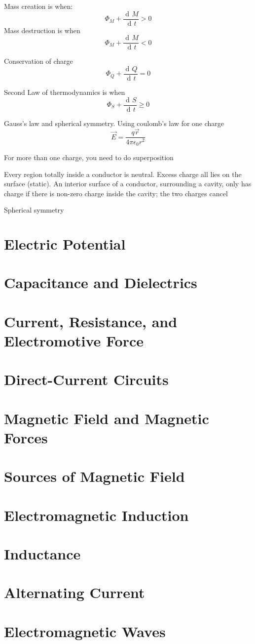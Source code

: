 \documentclass[11pt, letterpaper, titlepage]{report}
\DeclareMathOperator{\di}{d\!} %
\begin{document}
Mass creation is when:
\begin{equation}
\Phi_M + \frac{\di M}{\di t} > 0
\end{equation}
Mass destruction is when
\begin{equation}
\Phi_M + \frac{\di M}{\di t} < 0
\end{equation}

Conservation of charge
\begin{equation}
\Phi_Q + \frac{\di Q}{\di t} = 0
\end{equation}

Second Law of thermodynamics is when
\begin{equation}
\Phi_S + \frac{\di S}{\di t} \geq 0
\end{equation}

Gauss's law and spherical symmetry. Using coulomb's law for one charge
\begin{equation}
\vec{E} = \frac{q \vec{r}}{4 \pi \epsilon_0 r^2}
\end{equation}

For more than one charge, you need to do superposition

Every region totally inside a conductor is neutral. Excess charge all lies on the surface (static). An interior surface of a conductor, surrounding a cavity, only has charge if there is non-zero charge inside the cavity; the two charges cancel

Spherical symmetry




\chapter{Electric Potential}
\chapter{Capacitance and Dielectrics}
\chapter{Current, Resistance, and Electromotive Force}
\chapter{Direct-Current Circuits}
\chapter{Magnetic Field and Magnetic Forces}
\chapter{Sources of Magnetic Field}
\chapter{Electromagnetic Induction}
\chapter{Inductance}
\chapter{Alternating Current}
\chapter{Electromagnetic Waves}
\end{document}
